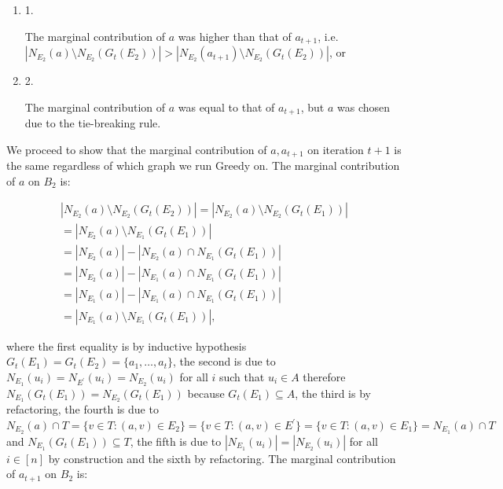 \begin{enumerate}


\item[] 1. 


The marginal contribution of $a$ was higher than that of $a_{t+1}$, i.e. $|N_{E_{2}}(a)\setminus N_{E_{2}}(G_{t}(E_{2}))|>|N_{E_{2}}(a_{t+1})\setminus N_{E_{2}}(G_{t}(E_{2}))|$, or\par




\item[] 2. 


The marginal contribution of $a$ was equal to that of $a_{t+1}$, but $a$ was chosen due to the tie-breaking rule.\par




\end{enumerate}


We proceed to show that the marginal contribution of $a,a_{t+1}$ on iteration $t+1$ is the same regardless of which graph we run Greedy on. The marginal contribution of $a$ on $B_{2}$ is:\par


\[\begin{gathered}
\displaystyle|N_{E_{2}}(a)\setminus N_{E_{2}}(G_{t}(E_{2}))| \displaystyle=|N_{E_{2}}(a)\setminus N_{E_{2}}(G_{t}(E_{1}))| \\
\displaystyle=|N_{E_{2}}(a)\setminus N_{E_{1}}(G_{t}(E_{1}))| \\
\displaystyle=|N_{E_{2}}(a)|-|N_{E_{2}}(a)\cap N_{E_{1}}(G_{t}(E_{1}))| \\
\displaystyle=|N_{E_{2}}(a)|-|N_{E_{1}}(a)\cap N_{E_{1}}(G_{t}(E_{1}))| \\
\displaystyle=|N_{E_{1}}(a)|-|N_{E_{1}}(a)\cap N_{E_{1}}(G_{t}(E_{1}))| \\
\displaystyle=|N_{E_{1}}(a)\setminus N_{E_{1}}(G_{t}(E_{1}))|,
\end{gathered}\]


where the first equality is by inductive hypothesis $G_{t}(E_{1})=G_{t}(E_{2})=\{a_{1},\dots,a_{t}\}$, the second is due to $N_{E_{1}}(u_{i})=N_{E^{\prime}}(u_{i})=N_{E_{2}}(u_{i})$ for all $i$ such that $u_{i}\in A$ therefore $N_{E_{1}}(G_{t}(E_{1}))=N_{E_{2}}(G_{t}(E_{1}))$ because $G_{t}(E_{1})\subseteq A$, the third is by refactoring,
the fourth is due to $N_{E_{2}}(a)\cap T=\{v\in T:(a,v)\in E_{2}\}=\{v\in T:(a,v)\in E^{\prime}\}=\{v\in T:(a,v)\in E_{1}\}=N_{E_{1}}(a)\cap T$ and $N_{E_{1}}(G_{t}(E_{1}))\subseteq T$, the fifth is due to $|N_{E_{1}}(u_{i})|=|N_{E_{2}}(u_{i})|$ for all $i\in[n]$ by construction and the sixth by refactoring.
The marginal contribution of $a_{t+1}$ on $B_{2}$ is:\par


